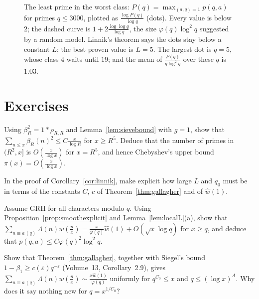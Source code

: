 \begin{figure}[ht]
\centering{}
\caption{The least prime in the worst class: $P(q)=\max_{(a,q)=1}p(q,a)$ for primes $q\le3000$, plotted as $\frac{\log P(q)}{\log q}$ (dots). Every value is below $2$; the dashed curve is $1+2\frac{\log\log q}{\log q}$, the size $\varphi(q)\log^2q$ suggested by a random model. Linnik's theorem says the dots stay below a constant $L$; the best proven value is $L=5$. The largest dot is $q=5$, whose class $4$ waits until $19$; and the mean of $\frac{P(q)}{q\log^2q}$ over these $q$ is $1.03$.}
\label{fig:leastprime}
\end{figure}

\section{Exercises}

\begin{exercise}[$\star$]\label{ex:sieveupper}
Using $\beta_R^2=1*\rho_{R,R}$ and Lemma~\ref{lem:sievebound} with $g=1$, show that $\sum_{n\le x}\beta_R(n)^2\le C\frac x{\log R}$ for $x\ge R^5$. Deduce that the number of primes in $(R^2,x]$ is $O(\frac x{\log x})$ for $x=R^5$, and hence Chebyshev's upper bound $\pi(x)=O(\frac x{\log x})$.
\end{exercise}

\begin{exercise}[$\star$]\label{ex:linnikdetail}
In the proof of Corollary~\ref{cor:linnik}, make explicit how large $L$ and $q_0$ must be in terms of the constants $C$, $c$ of Theorem~\ref{thm:gallagher} and of $\hat w(1)$.
\end{exercise}

\begin{exercise}[$\star\star$]\label{ex:grhlinnik}
Assume GRH for all characters modulo $q$. Using Proposition~\ref{prop:smoothexplicit} and Lemma~\ref{lem:localL}(a), show that $\sum_{n\equiv a\,(q)}\Lambda(n)w(\frac nx)=\frac x{\varphi(q)}\hat w(1)+O(\sqrt x\log q)$ for $x\ge q$, and deduce that $p(q,a)\le C\varphi(q)^2\log^2q$.
\end{exercise}

\begin{exercise}[$\star\star$]\label{ex:siegelwalfisz}
Show that Theorem~\ref{thm:gallagher}, together with Siegel's bound $1-\beta_1\ge c(\varepsilon)q^{-\varepsilon}$ (Volume~13, Corollary~2.9), gives $\sum_{n\equiv a\,(q)}\Lambda(n)w(\frac nx)\sim\frac{x\hat w(1)}{\varphi(q)}$ uniformly for $q^{C_0}\le x$ and $q\le(\log x)^A$. Why does it say nothing new for $q=x^{1/C_0}$?
\end{exercise}


